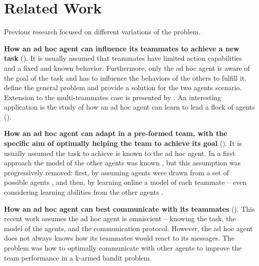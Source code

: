 
\section{Related Work}

Previous research focused on different variations of the problem.

\textbf{How an ad hoc agent can influence its teammates to achieve a new task} (\cite{stone2013teaching}). It is usually assumed that teammates have limited action capabilities and a fixed and known behavior. Furthermore, only the ad hoc agent is aware of the goal of the task and has to influence the behaviors of the others to fulfill it. \cite{stone2010teach,stone2013teaching} define the general problem and provide a solution for the two agents scenario. Extension to the multi-teammates case is presented by \cite{agmon12leading}. An interesting application is the study of how an ad hoc agent can learn to lead a flock of agents (\cite{genter2013flock}).

\textbf{How an ad hoc agent can adapt in a pre-formed team, with the specific aim of optimally helping the team to achieve its goal} (\cite{barrett2013team}). It is usually assumed the task to achieve is known to the ad hoc agent. In a first approach the model of the other agents was known \cite{barrett2011empirical}, but this assumption was progressively removed: first, by assuming agents were drawn from a set of possible agents \cite{barrett2011empirical,genter2011role}, and then, by learning online a model of each teammate \cite{barrett2013team} -- even considering learning abilities from the other agents \cite{chakraborty2013cooperating}.

\textbf{How an ad hoc agent can best communicate with its teammates} (\cite{barrett2014communicating}). This recent work assumes the ad hoc agent is omniscient -- knowing the task, the model of the agents, and the communication protocol. However, the ad hoc agent does not always knows how its teammates would react to its messages. The problem was how to optimally communicate with other agents to improve the team performance in a k-armed bandit problem.

